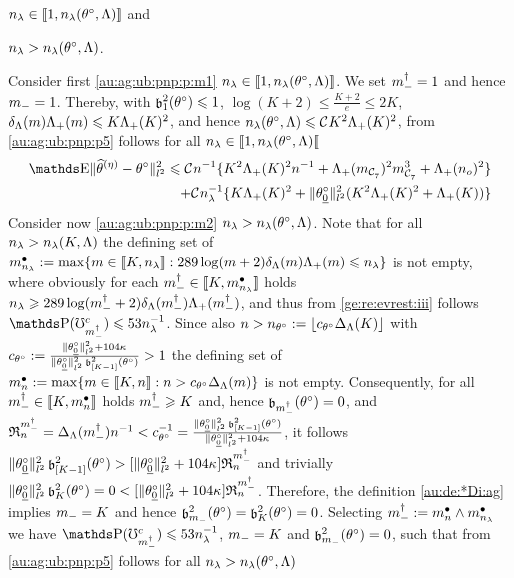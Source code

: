 \begin{pro}
\begin{inparaenum}[i]
$\ssE\in\nset{1,\ssE(\xdf,\Lambda)}$ and \item\label{au:ag:ub:pnp:p:m2}
$\ssE>\ssE(\xdf,\Lambda)$. \end{inparaenum}
Consider first \ref{au:ag:ub:pnp:p:m1} $\ssE\in\nset{1,\ssE(\xdf,\Lambda)}$.
We set $\mdDi=1$ and hence
$\mDi=1$. Thereby, with $\bias[1]^2(\xdf)\leq1$, $\log(K+2)\leq
\tfrac{K+2}{e}\leq 2K$, $\cmiSv[\Di]\miSv[\Di]\leq K\miSv[K]^2$, and hence $\ssE(\xdf,\Lambda)\leq\cst{}K^2\miSv[K]^2$,
from \eqref{au:ag:ub:pnp:p5} follows for all $\ssE\in\nsetro{1,\ssE(\xdf,\Lambda)}$
\begin{multline}\label{au:ag:ub:pnp:p6}
  \E\Vnormlp{\widehat{\theta}^{(\eta)}-\xdf}^2\leq \cst{}\ssY^{-1}\{K^2\miSv[K]^2\ssY^{-1}+\miSv[\Di_{\cst{7}}]^2\Di_{\cst{7}}^3+\miSv[\ssY_{o}]^2\}\\\hfill
    +\cst{}\ssE^{-1}\{K\miSv[K]^2+ \Vnormlp{\xdf_{\underline{0}}}^2(K^2\miSv[K]^2+\miSv[K])\}
  \end{multline}
Consider now \ref{au:ag:ub:pnp:p:m2} $\ssE>\ssE(\xdf,\Lambda)$. Note that for all $\ssE> \ssE(K,\Lambda)$ the defining set of
$\sDi{\ssE}:=\max\{\Di\in\nset{K,\ssE}:289\log(\Di+2)\cmiSv[\Di]\miSv[\Di]\leq\ssE\}$
is not empty, where obviously for each
$\mdDi\in\nset{K,\sDi{\ssE}}$ holds 
$\ssE\geq289\log(\mdDi+2)\cmiSv[\mdDi]\miSv[\mdDi]$, and thus from
 \ref{ge:re:evrest:iii} follows
$\P(\aixEv[\mdDi]^c)\leq 53\ssE^{-1}$.
Since also
$\ssY> \ssY_{\xdf}:=\floor{c_{\xdf}\DipenSv[K]}$ with
$c_{\xdf}:=\tfrac{\Vnormlp{\xdf_{\underline{0}}}^2+104\cpen}{\Vnormlp{\xdf_{\underline{0}}}^2\bias[{[K-1]}]^2(\xdf)}>1$
the defining set of
$\sDi{\ssY}:=\max\{\Di\in\nset{K,\ssY}:\ssY>c_{\xdf}\DipenSv\}$ is not
empty. Consequently,  for all $\mdDi\in\nset{K,\sDi{\ssY}}$ holds $\mdDi \geq K$ and, hence 
$\bias[\mdDi](\xdf)=0$, and
$\daRaS{\mdDi}{\xdf,\Lambda}=\DipenSv[\mdDi]\ssY^{-1}<c_{\xdf}^{-1}=\tfrac{\Vnormlp{\xdf_{\underline{0}}}^2\bias[{[K-1]}]^2(\xdf)}{\Vnormlp{\xdf_{\underline{0}}}^2+104\cpen}$,
it follows
$\Vnormlp{\xdf_{\underline{0}}}^2\bias[{[K-1]}]^2(\xdf)>[\Vnormlp{\xdf_{\underline{0}}}^2+104\cpen]\daRaS{\mdDi}{\xdf,\Lambda}$
and trivially
$\Vnormlp{\xdf_{\underline{0}}}^2\bias[{K}]^2(\xdf)=0<[\Vnormlp{\xdf_{\underline{0}}}^2+104\cpen]\daRaS{\mdDi}{\xdf,\Lambda}$. Therefore, the definition \eqref{au:de:*Di:ag}
implies $\mDi=K$ and hence
$\bias[\mDi]^2(\xdf)=\bias[K]^2(\xdf)=0$. Selecting
  $\mdDi:=\sDi{\ssY}\wedge\sDi{\ssE}$ we have 
$\P(\aixEv[\mdDi]^c)\leq 53\ssE^{-1}$, 
$\mDi=K$ and $\bias[\mDi]^2(\xdf)=0$, such that 
 from  \eqref{au:ag:ub:pnp:p5} follows for all $\ssE>\ssE(\xdf,\Lambda)$

\end{pro}
